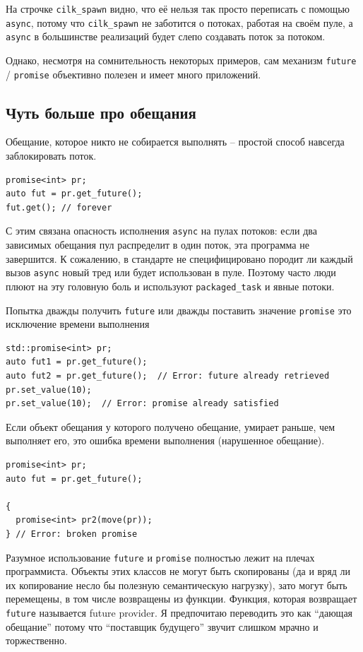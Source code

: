 \documentclass[a4paper,12pt,oneside]{book}
\begin{document}
На строчке \lstinline!cilk_spawn! видно, что её нельзя так просто переписать с помощью \lstinline!async!, потому что \lstinline!cilk_spawn! не заботится о потоках, работая на своём пуле, а \lstinline!async! в большинстве реализаций будет слепо создавать поток за потоком.

Однако, несмотря на сомнительность некоторых примеров, сам механизм \lstinline!future! / \lstinline!promise! объективно полезен и имеет много приложений.

\subsection{Чуть больше про обещания}\label{sub:promises}

Обещание, которое никто не собирается выполнять -- простой способ навсегда заблокировать поток.

\begin{lstlisting}
promise<int> pr;
auto fut = pr.get_future();
fut.get(); // forever
\end{lstlisting}

С этим связана опасность исполнения \lstinline!async! на пулах потоков: если два зависимых обещания пул распределит в один поток, эта программа не завершится. К сожалению, в стандарте не специфицировано породит ли каждый вызов \lstinline!async! новый тред или будет использован в пуле. Поэтому часто люди плюют на эту головную боль и используют \lstinline!packaged_task! и явные потоки.

Попытка дважды получить \lstinline!future! или дважды поставить значение \lstinline!promise! это исключение времени выполнения

\begin{lstlisting}
std::promise<int> pr;
auto fut1 = pr.get_future();
auto fut2 = pr.get_future();  // Error: future already retrieved
pr.set_value(10);
pr.set_value(10);  // Error: promise already satisfied
\end{lstlisting}

Если объект обещания у которого получено обещание, умирает раньше, чем выполняет его, это ошибка времени выполнения (нарушенное обещание).

\begin{lstlisting}
promise<int> pr;
auto fut = pr.get_future();

{
  promise<int> pr2(move(pr));
} // Error: broken promise
\end{lstlisting}

Разумное использование \lstinline!future! и \lstinline!promise! полностью лежит на плечах программиста. Объекты этих классов не могут быть скопированы (да и вряд ли их копирование несло бы полезную семантическую нагрузку), зато могут быть перемещены, в том числе возвращены из функции. Функция, которая возвращает \lstinline!future! называется future provider. Я предпочитаю переводить это как ``дающая обещание'' потому что ``поставщик будущего'' звучит слишком мрачно и торжественно.
\end{document}
